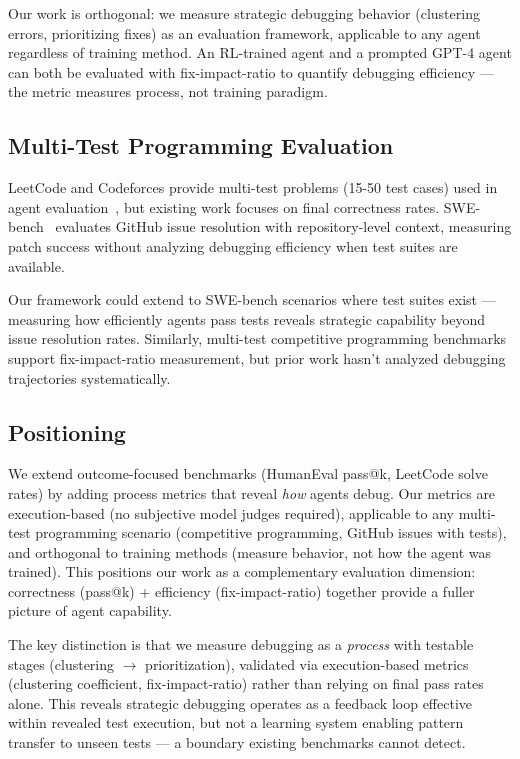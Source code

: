 Our work is orthogonal: we measure strategic debugging behavior (clustering errors, prioritizing fixes) as an evaluation framework, applicable to any agent regardless of training method. An RL-trained agent and a prompted GPT-4 agent can both be evaluated with fix-impact-ratio to quantify debugging efficiency — the metric measures process, not training paradigm.

\subsection{Multi-Test Programming Evaluation}

LeetCode and Codeforces provide multi-test problems (15-50 test cases) used in agent evaluation~\cite{Jain2024LiveCodeBench}, but existing work focuses on final correctness rates. SWE-bench~\cite{Jimenez2024SWE} evaluates GitHub issue resolution with repository-level context, measuring patch success without analyzing debugging efficiency when test suites are available.

Our framework could extend to SWE-bench scenarios where test suites exist — measuring how efficiently agents pass tests reveals strategic capability beyond issue resolution rates. Similarly, multi-test competitive programming benchmarks support fix-impact-ratio measurement, but prior work hasn't analyzed debugging trajectories systematically.

\subsection{Positioning}

We extend outcome-focused benchmarks (HumanEval pass@k, LeetCode solve rates) by adding process metrics that reveal \emph{how} agents debug. Our metrics are execution-based (no subjective model judges required), applicable to any multi-test programming scenario (competitive programming, GitHub issues with tests), and orthogonal to training methods (measure behavior, not how the agent was trained). This positions our work as a complementary evaluation dimension: correctness (pass@k) + efficiency (fix-impact-ratio) together provide a fuller picture of agent capability.

The key distinction is that we measure debugging as a \emph{process} with testable stages (clustering $\rightarrow$ prioritization), validated via execution-based metrics (clustering coefficient, fix-impact-ratio) rather than relying on final pass rates alone. This reveals strategic debugging operates as a feedback loop effective within revealed test execution, but not a learning system enabling pattern transfer to unseen tests — a boundary existing benchmarks cannot detect.
